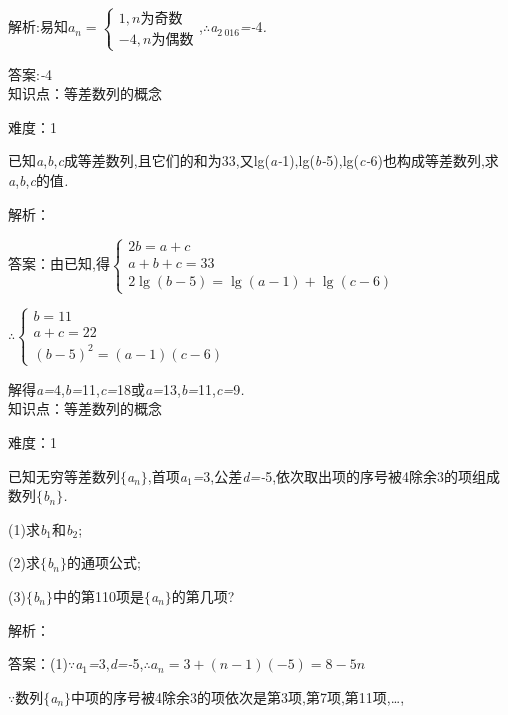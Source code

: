 \documentclass{article} %
\begin{document}
 解析:易知$a_n=\left\{
\begin{array}{l}
1, n为奇数 \\
-4,n为偶数
\end{array}
\right.$,\textit{$\therefore$a}${}_{2\ 016}$\textit{=-}4\textit{.}

 答案:\textit{-}4 \\

知识点：等差数列的概念

难度：1

 已知\textit{a},\textit{b},\textit{c}成等差数列,且它们的和为33,又lg(\textit{a-}1),lg(\textit{b-}5),lg(\textit{c-}6)也构成等差数列,求\textit{a},\textit{b},\textit{c}的值\textit{.}

解析：

 答案：由已知,得$\left\{
\begin{array}{l}
2b=a+c \\
a+b+c=33 \\
2\lg(b-5)=\lg(a-1)+\lg(c-6)
\end{array}
\right.$

$\therefore \left\{
\begin{array}{l}
b=11 \\
a+c=22 \\
(b-5)^2=(a-1)(c-6)
\end{array}
\right.$

解得\textit{a=}4,\textit{b=}11,\textit{c=}18或\textit{a=}13,\textit{b=}11,\textit{c=}9\textit{.} \\

知识点：等差数列的概念

难度：1

 已知无穷等差数列$\mathrm{\{}$\textit{a${}_{n}$}$\mathrm{\}}$,首项\textit{a}${}_{1}$\textit{=}3,公差\textit{d=-}5,依次取出项的序号被4除余3的项组成数列$\mathrm{\{}$\textit{b${}_{n}$}$\mathrm{\}}$\textit{.}

 (1)求\textit{b}${}_{1}$和\textit{b}${}_{2}$;

 (2)求$\mathrm{\{}$\textit{b${}_{n}$}$\mathrm{\}}$的通项公式;

 (3)$\mathrm{\{}$\textit{b${}_{n}$}$\mathrm{\}}$中的第110项是$\mathrm{\{}$\textit{a${}_{n}$}$\mathrm{\}}$的第几项?

解析：

 答案：(1)\textit{$\because$a}${}_{1}$\textit{=}3,\textit{d=-}5,$\therefore a_n = 3+(n-1)(-5) = 8-5n$

\textit{$\because$}数列$\mathrm{\{}$\textit{a${}_{n}$}$\mathrm{\}}$中项的序号被4除余3的项依次是第3项,第7项,第11项,{\dots},
\end{document}
